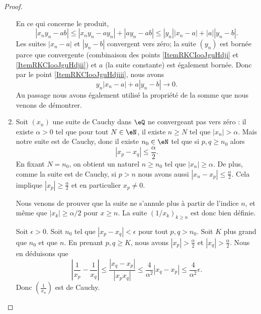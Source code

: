 \begin{proof}
\begin{enumerate}
            En ce qui concerne le produit,
            \begin{equation}
                | x_ny_n-ab |\leq | x_ny_n-ay_n |+| ay_n-ab |\leq | y_n || x_n-a |+| a || y_n-b |.
            \end{equation}
            Les suites \( | x_n-a |\) et \( | y_n-b |\) convergent vers zéro; la suite \( (y_n)\) est bornée parce que convergente (combinaison des points \ref{ItemRKCIooJguHdji} et \ref{ItemRKCIooJguHdjii})  et \( a\) (la suite constante) est également bornée. Donc par le point \ref{ItemRKCIooJguHdjiii}, nous avons
            \begin{equation}
                y_n| x_n-a |+a| y_n-b |\to 0.
            \end{equation}
            Au passage nous avons également utilisé la propriété de la somme que nous venons de démontrer.
        \item Soit \( (x_n)\) une suite de Cauchy dans \( \eQ\) ne convergeant pas vers zéro : il existe \( \alpha>0\) tel que pour tout \( N\in \eN\), il existe \( n\geq N\) tel que \( | x_n |>\alpha\). Mais notre suite est de Cauchy, donc il existe \( n_0\in \eN\) tel que si \( p,q\geq n_0\) alors 
            \begin{equation}
                | x_p-x_q |\leq \frac{ \alpha }{2}.
            \end{equation}
            En fixant \( N = n_0\), on obtient un naturel \( n\geq n_0\) tel que \( | x_n |\geq \alpha\). De plus, comme la suite est de Cauchy, si \( p>n\) nous avons aussi \( | x_n-x_p |\leq \frac{ \alpha }{2}\). Cela implique \( | x_p |\geq \frac{ \alpha }{2}\) et en particulier \( x_p\neq 0\).

            Nous venons de prouver que la suite ne s'annule plus à partir de l'indice \( n\), et même que \( | x_k |\geq\alpha/2\) pour \( x\geq n\). La suite \( (1/x_k)_{k\geq n}\) est donc bien définie.

            Soit \( \epsilon>0\). Soit \( n_0\) tel que \( | x_p-x_q |<\epsilon\) pour tout \( p,q>n_0\). Soit \( K\) plus grand que \( n_0\) et que \( n\). En prenant \( p,q\geq K\), nous avons \( |  x_p|>\frac{ \alpha }{2}\) et \( | x_q |>\frac{ \alpha }{2}\). Nous en déduisons que 
            \begin{equation}
                \left| \frac{1}{ x_p }-\frac{1}{ x_q } \right| \leq \frac{ | x_q-x_p | }{ | x_px_q | }\leq \frac{ 4 }{ \alpha^2 }| x_q-x_p |\leq \frac{ 4 }{ \alpha^2 }\epsilon.
            \end{equation}
            Donc \( \left( \frac{1}{ x_n } \right)\) est de Cauchy.
    \end{enumerate}
\end{proof}

